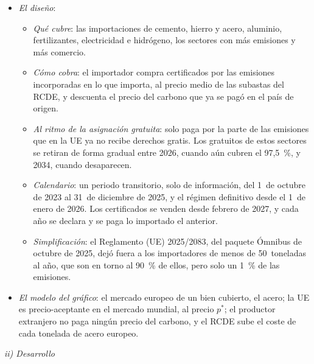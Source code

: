 \documentclass[11pt]{article}
\begin{document}
\begin{itemize}
\item \emph{El diseño}\nocite{UE2023Reglamento956}:
  \begin{itemize}
  \item \emph{Qué cubre}: las importaciones de cemento, hierro y acero, aluminio, fertilizantes, electricidad e hidrógeno, los sectores con más emisiones y más comercio.
  \item \emph{Cómo cobra}: el importador compra certificados por las emisiones incorporadas en lo que importa, al precio medio de las subastas del RCDE, y descuenta el precio del carbono que ya se pagó en el país de origen.
  \item \emph{Al ritmo de la asignación gratuita}: solo paga por la parte de las emisiones que en la UE ya no recibe derechos gratis. Los gratuitos de estos sectores se retiran de forma gradual entre 2026, cuando aún cubren el 97,5~\%, y 2034, cuando desaparecen\nocite{UE2023Directiva959}.
  \item \emph{Calendario}: un periodo transitorio, solo de información, del 1~de octubre de 2023 al 31~de diciembre de 2025, y el régimen definitivo desde el 1~de enero de 2026. Los certificados se venden desde febrero de 2027, y cada año se declara y se paga lo importado el anterior\nocite{CE2026CBAMDefinitivo}.
  \item \emph{Simplificación}: el Reglamento (UE) 2025/2083, del paquete Ómnibus de octubre de 2025, dejó fuera a los importadores de menos de 50~toneladas al año, que son en torno al 90~\% de ellos, pero solo un 1~\% de las emisiones\nocite{UE2025Reglamento2083}.
  \end{itemize}
\item \emph{El modelo del gráfico}: el mercado europeo de un bien cubierto, el acero; la UE es precio-aceptante en el mercado mundial, al precio $p^*$; el productor extranjero no paga ningún precio del carbono, y el RCDE sube el coste de cada tonelada de acero europeo.
\end{itemize}

\hspace*{3.6em}\emph{ii) Desarrollo}
\end{document}
